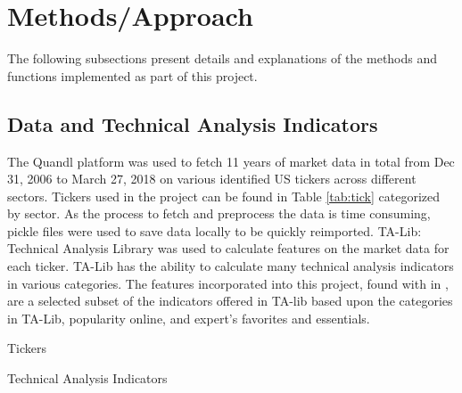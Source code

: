 \documentclass{article}
\begin{document}
\section{Methods/Approach}
The following subsections present details and explanations of the methods and functions implemented as part of this project.

\subsection{Data and Technical Analysis Indicators}
The Quandl platform was used to fetch 11 years of market data in total from Dec 31, 2006 to March 27, 2018 on various identified US tickers across different sectors. Tickers used in the project can be found in Table \ref{tab:tick} categorized by sector. As the process to fetch and preprocess the data is time consuming, pickle files were used to save data locally to be quickly reimported. TA-Lib: Technical Analysis Library was used to calculate features on the market data for each ticker. TA-Lib has the ability to calculate many technical analysis indicators in various categories. The features incorporated into this project, found with in , are a selected subset of the indicators offered in TA-lib based upon the categories in TA-Lib, popularity online, and expert's favorites and essentials.

\begin{table}[h]
	\centering
	\caption{Tickers}
	\label{tab:tick}
\end{table}

\begin{table}[h]
	\caption{Technical Analysis Indicators}
	\label{tab:inds}
\end{table}
\end{document}
